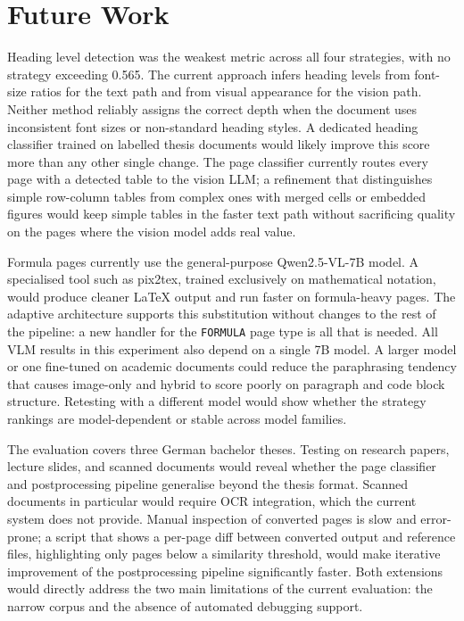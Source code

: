 \section{Future Work}

Heading level detection was the weakest metric across all four strategies, with
no strategy exceeding 0.565. The current approach infers heading levels from
font-size ratios for the text path and from visual appearance for the vision path.
Neither method reliably assigns the correct depth when the document uses
inconsistent font sizes or non-standard heading styles. A dedicated heading
classifier trained on labelled thesis documents would likely improve this score
more than any other single change. The page classifier currently routes every page
with a detected table to the vision LLM; a refinement that distinguishes simple
row-column tables from complex ones with merged cells or embedded figures would
keep simple tables in the faster text path without sacrificing quality on the
pages where the vision model adds real value.

Formula pages currently use the general-purpose Qwen2.5-VL-7B model. A
specialised tool such as pix2tex, trained exclusively on mathematical notation,
would produce cleaner \LaTeX{} output and run faster on formula-heavy pages. The
adaptive architecture supports this substitution without changes to the rest of
the pipeline: a new handler for the \texttt{FORMULA} page type is all that is
needed. All VLM results in this experiment also depend on a single 7B model. A
larger model or one fine-tuned on academic documents could reduce the paraphrasing
tendency that causes image-only and hybrid to score poorly on paragraph and code
block structure. Retesting with a different model would show whether the strategy
rankings are model-dependent or stable across model families.

The evaluation covers three German bachelor theses. Testing on research papers,
lecture slides, and scanned documents would reveal whether the page classifier and
postprocessing pipeline generalise beyond the thesis format. Scanned documents in
particular would require OCR integration, which the current system does not
provide. Manual inspection of converted pages is slow and error-prone; a script
that shows a per-page diff between converted output and reference files,
highlighting only pages below a similarity threshold, would make iterative
improvement of the postprocessing pipeline significantly faster. Both extensions
would directly address the two main limitations of the current evaluation: the
narrow corpus and the absence of automated debugging support.
